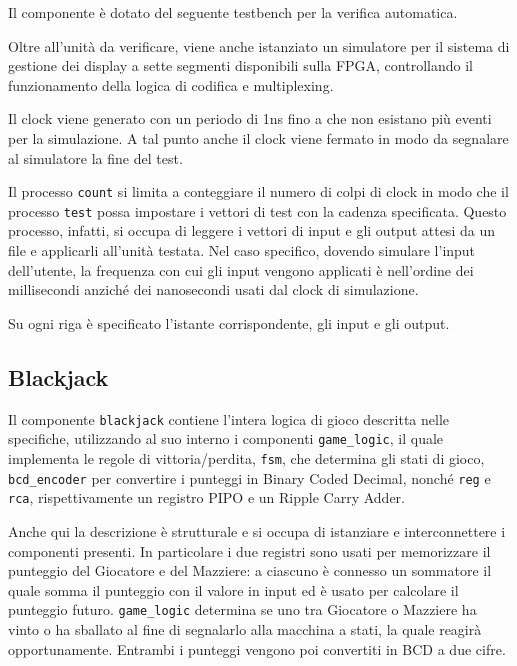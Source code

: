 \documentclass [11pt,a4paper,oneside]{article}
\newcommand{\component}[1]{\texttt{#1}}
\newcommand{\identifier}[1]{\texttt{#1}}
\begin{document}
Il componente è dotato del seguente testbench per la verifica automatica.



Oltre all'unità da verificare, viene anche istanziato un simulatore per il
sistema di gestione dei display a sette segmenti disponibili sulla FPGA,
controllando il funzionamento della logica di codifica e multiplexing.

Il clock viene generato con un periodo di 1ns fino a che non esistano più
eventi per la simulazione. A tal punto anche il clock viene fermato in 
modo da segnalare al simulatore la fine del test.

Il processo \identifier{count} si limita a conteggiare il numero di colpi di clock
in modo che il processo \identifier{test} possa impostare i vettori di test con 
la cadenza specificata. Questo processo, infatti, si occupa di leggere
i vettori di input e gli output attesi da un file e applicarli all'unità
testata. Nel caso specifico, dovendo simulare l'input dell'utente, la
frequenza con cui gli input vengono applicati è nell'ordine dei 
millisecondi anziché dei nanosecondi usati dal clock di simulazione.



Su ogni riga è specificato l'istante corrispondente, gli input e gli
output.

\subsection{Blackjack}
Il componente \component{blackjack} contiene l'intera logica di gioco descritta
nelle specifiche, utilizzando al suo interno i componenti
\component{game\_logic}, il quale implementa le regole di vittoria/perdita,
\component{fsm}, che determina gli stati di gioco, \component{bcd\_encoder} per
convertire i punteggi in Binary Coded Decimal, nonché \component{reg} e \component{rca},
rispettivamente un registro PIPO e un Ripple Carry Adder.




Anche qui la descrizione è strutturale e si occupa di istanziare e 
interconnettere i componenti presenti. In particolare i due registri
sono usati per memorizzare il punteggio del Giocatore e del Mazziere:
a ciascuno è connesso un sommatore il quale somma il punteggio con il
valore in input ed è usato per calcolare il punteggio futuro.
\component{game\_logic} determina se uno tra Giocatore o Mazziere ha vinto o
ha sballato al fine di segnalarlo alla macchina a stati, la quale
reagirà opportunamente. Entrambi i punteggi vengono poi convertiti in
BCD a due cifre.
\end{document}
